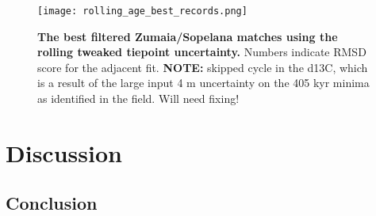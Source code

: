 \documentclass[draft]{agujournal2019}
\begin{document}
\begin{figure}[htb]
  \centering
  \texttt{[image: rolling\_age\_best\_records.png]}
  \caption{\label{fig:rolling-age} \textbf{The best filtered Zumaia/Sopelana
      matches using the rolling tweaked tiepoint uncertainty.} Numbers indicate
    \gls{RMSD} score for the adjacent fit. \textbf{NOTE:} skipped cycle in the
    \gls{d13C}, which is a result of the large input \textpm{}4 m uncertainty on the
    405 kyr minima as identified in the field. Will need fixing! }
\end{figure}




\section{Discussion}\label{sec:discussion}




\subsection{Conclusion}\label{sec:conclusion}







%
%
%
%
%
%
%
%
%
%
\end{document}
